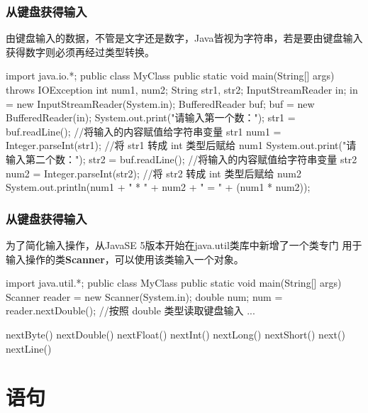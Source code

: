\begin{frame}[fragile]
  \frametitle{从键盘获得输入}

  由键盘输入的数据，不管是文字还是数字，Java皆视为{\hei\Red 字符串}，若是要由键盘输入获得数字则必须再经过类型转换。


  \begin{javaCode}
    import java.io.*;
    public class MyClass {
      public static void main(String[] args) throws IOException {
        int num1, num2;
        String str1, str2;
        InputStreamReader in;
        in = new InputStreamReader(System.in);
        BufferedReader buf;
        buf = new BufferedReader(in);
        System.out.print("请输入第一个数：");
        str1 = buf.readLine();         //将输入的内容赋值给字符串变量 str1
        num1 = Integer.parseInt(str1);   //将 str1 转成 int 类型后赋给 num1
        System.out.print("请输入第二个数：");
        str2 = buf.readLine();         //将输入的内容赋值给字符串变量 str2
        num2 = Integer.parseInt(str2);   //将 str2 转成 int 类型后赋给 num2
        System.out.println(num1 + " * " + num2 + " = " + (num1 * num2));
      }
    }
  \end{javaCode}
\end{frame}

\begin{frame}[fragile]
  \frametitle{从键盘获得输入}

  为了简化输入操作，从JavaSE 5版本开始在java.util类库中新增了一个类专门
  用于输入操作的类{\bf\Red Scanner}，可以使用该类输入一个对象。

  \begin{javaCode}
    import java.util.*;
    public class MyClass {
      public static void main(String[] args)
      {
        Scanner reader = new Scanner(System.in); 
        double num;
        num = reader.nextDouble(); //按照 double 类型读取键盘输入
        ...
      }
    }
  \end{javaCode}

  
  {\small\Blue nextByte() nextDouble() nextFloat() nextInt() nextLong() nextShort() next() nextLine()}
\end{frame}

\section{语句}

